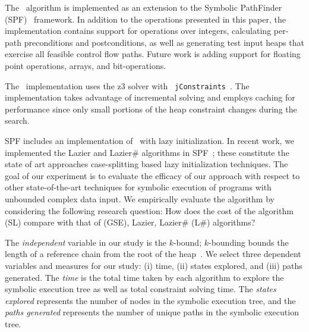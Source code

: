 
The~\symtxt{} algorithm is implemented as an extension to the Symbolic
PathFinder (SPF)~\cite{DBLP:journals/ase/PasareanuVBGMR13}
framework. In addition to the operations presented in this paper, the
implementation contains support for operations over integers,
calculating per-path preconditions and postconditions, as well as
generating test input heaps that exercise all feasible control flow
paths. Future work is adding support for floating point
operations, arrays, and bit-operations.

The~\symtxt{} implementation uses the z3 solver with ~\texttt{jConstraints}~\cite{ase2014-ghilrr,jpf2014-dghirr,deMouraBjorner08Z3}. The implementation takes advantage of incremental solving and employs caching for performance since only small portions of the heap constraint changes during the search.

SPF includes an implementation of~\gsetxt{} with lazy initialization.
In recent work, we implemented the Lazier and Lazier\# algorithms in
SPF~\cite{Hillery:2014}; these constitute the state of art approaches
case-splitting based lazy initialization techniques. The goal of our
experiment is to evaluate the efficacy of our approach with respect to
other state-of-the-art techniques for symbolic execution of programs
with unbounded complex data input. We empirically evaluate the
\symtxt{} algorithm by considering the following research question:
How does the cost of the \symtxt{} algorithm (SL) compare with that of
\gsetxt{} (GSE), Lazier, Lazier\# (L\#) algorithms?

The \emph{independent} variable in our study is the $k$-bound;
$k$-bounding bounds the length of a reference chain from the root of
the heap~\cite{Kiasan06}.  We select three dependent variables and
measures for our study: (i) time, (ii) states explored, and (iii)
paths generated. The \emph{time} is the total time taken by each
algorithm to explore the symbolic execution tree as well as total
constraint solving time. The \emph{states explored} represents the
number of nodes in the symbolic execution tree, and the \emph{paths
  generated} represents the number of unique paths in the symbolic
execution tree.

